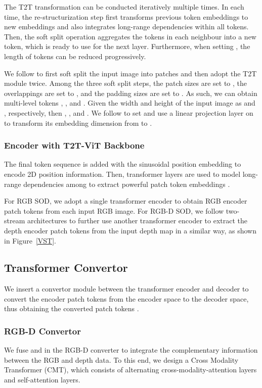 \documentclass[10pt,twocolumn,letterpaper]{article}
\begin{document}
The T2T transformation can be conducted iteratively multiple times. In each time, the re-structurization step first transforms previous token embeddings to new embeddings and also integrates long-range dependencies within all tokens. Then, the soft split operation aggregates the tokens in each  neighbour into a new token, which is ready to use for the next layer. Furthermore, when setting , the length of tokens can be reduced progressively.

We follow \cite{yuan2021tokens} to first soft split the input image into patches and then adopt the T2T module twice. Among the three soft split steps, the patch sizes are set to , the overlappings are set to , and the padding sizes are set to .
As such, we can obtain multi-level tokens , , and .
Given the width and height of the input image as  and , respectively, then , , and . We follow \cite{yuan2021tokens} to set  and use a linear projection layer on  to transform its embedding dimension from  to .
\vspace{-3mm}
\subsubsection{Encoder with T2T-ViT Backbone}
The final token sequence  is added with the sinusoidal position embedding \cite{vaswani2017attention} to encode 2D position information. Then,  transformer layers are used to model long-range dependencies among  to extract powerful patch token embeddings .

For RGB SOD, we adopt a single transformer encoder to obtain RGB encoder patch tokens  from each input RGB image. For RGB-D SOD, we follow two-stream architectures to further use another transformer encoder to extract the depth encoder patch tokens  from the input depth map in a similar way, as shown in Figure~\ref{VST}.


\subsection{Transformer Convertor}
We insert a convertor module between the transformer encoder and decoder to convert the encoder patch tokens  from the encoder space to the decoder space, thus obtaining the converted patch tokens .
\vspace{-3mm}
\subsubsection{RGB-D Convertor}
We fuse  and  in the RGB-D converter to integrate the complementary information between the RGB and depth data.
To this end, we design a Cross Modality Transformer (CMT), which consists of  alternating cross-modality-attention layers and self-attention layers.
\end{document}

